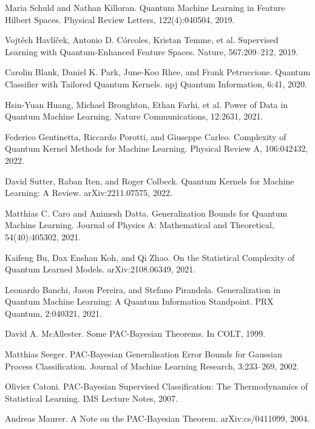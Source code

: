 \documentclass{article}
\begin{document}
\begin{thebibliography}{99}

Maria Schuld and Nathan Killoran. Quantum Machine Learning in Feature Hilbert Spaces. Physical Review Letters, 122(4):040504, 2019.

Vojtěch Havlíček, Antonio D. Córcoles, Kristan Temme, et al. Supervised Learning with Quantum-Enhanced Feature Spaces. Nature, 567:209–212, 2019.

Carolin Blank, Daniel K. Park, June-Koo Rhee, and Frank Petruccione. Quantum Classifier with Tailored Quantum Kernels. npj Quantum Information, 6:41, 2020.

Hsin-Yuan Huang, Michael Broughton, Ethan Farhi, et al. Power of Data in Quantum Machine Learning. Nature Communications, 12:2631, 2021.

Federico Gentinetta, Riccardo Porotti, and Giuseppe Carleo. Complexity of Quantum Kernel Methods for Machine Learning. Physical Review A, 106:042432, 2022.

David Sutter, Raban Iten, and Roger Colbeck. Quantum Kernels for Machine Learning: A Review. arXiv:2211.07575, 2022.

Matthias C. Caro and Animesh Datta. Generalization Bounds for Quantum Machine Learning. Journal of Physics A: Mathematical and Theoretical, 54(40):405302, 2021.

Kaifeng Bu, Dax Enshan Koh, and Qi Zhao. On the Statistical Complexity of Quantum Learned Models. arXiv:2108.06349, 2021.

Leonardo Banchi, Jason Pereira, and Stefano Pirandola. Generalization in Quantum Machine Learning: A Quantum Information Standpoint. PRX Quantum, 2:040321, 2021.

David A. McAllester. Some PAC-Bayesian Theorems. In COLT, 1999.

Matthias Seeger. PAC-Bayesian Generalisation Error Bounds for Gaussian Process Classification. Journal of Machine Learning Research, 3:233–269, 2002.

Olivier Catoni. PAC-Bayesian Supervised Classification: The Thermodynamics of Statistical Learning. IMS Lecture Notes, 2007.

Andreas Maurer. A Note on the PAC-Bayesian Theorem. arXiv:cs/0411099, 2004.


\end{thebibliography}
\end{document}
